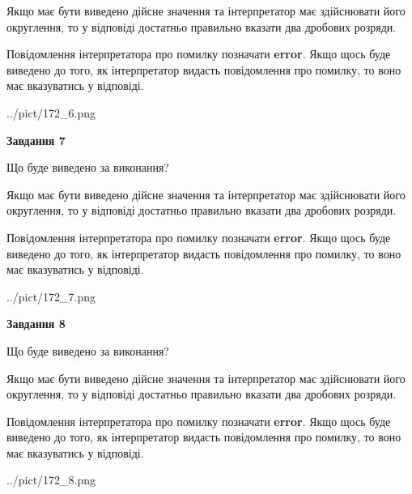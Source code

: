 \documentclass[12pt, ukrainian]{article}
\begin{document}
{\begin {Large}
Якщо має бути виведено дійсне значення та інтерпретатор має здійснювати його округлення, 
то у відповіді достатньо правильно вказати два дробових розряди.

Повідомлення інтерпретатора про помилку позначати \textbf{error}.
Якщо щось буде виведено до того, як інтерпретатор видасть повідомлення про помилку, 
то воно має вказуватись у відповіді. \par

\begin{center}
	{../pict/172_6.png}
\end{center}
\newpage

{\begin {center}\textbf{Завдання 7}\end {center}}\par
Що буде виведено за виконання? \par

Якщо має бути виведено дійсне значення та інтерпретатор має здійснювати його округлення, 
то у відповіді достатньо правильно вказати два дробових розряди.

Повідомлення інтерпретатора про помилку позначати \textbf{error}.
Якщо щось буде виведено до того, як інтерпретатор видасть повідомлення про помилку, 
то воно має вказуватись у відповіді. \par

\begin{center}
	{../pict/172_7.png}
\end{center}
\newpage

{\begin {center}\textbf{Завдання 8}\end {center}}\par
Що буде виведено за виконання? \par

Якщо має бути виведено дійсне значення та інтерпретатор має здійснювати його округлення, 
то у відповіді достатньо правильно вказати два дробових розряди.

Повідомлення інтерпретатора про помилку позначати \textbf{error}.
Якщо щось буде виведено до того, як інтерпретатор видасть повідомлення про помилку, 
то воно має вказуватись у відповіді. \par

\begin{center}
	{../pict/172_8.png}
\end{center}
\newpage


\end{Large}}
\end{document}
